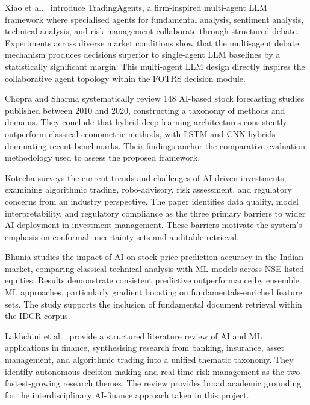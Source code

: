 \documentclass[12pt,a4paper,oneside]{report}
\theoremstyle{definition}
\theoremstyle{remark}
\begin{document}
\medskip

\noindent Xiao et al.\ \cite{Xiao2025TradingAgents} introduce TradingAgents, a firm-inspired multi-agent LLM framework where specialised agents for fundamental analysis, sentiment analysis, technical analysis, and risk management collaborate through structured debate. Experiments across diverse market conditions show that the multi-agent debate mechanism produces decisions superior to single-agent LLM baselines by a statistically significant margin. This multi-agent LLM design directly inspires the collaborative agent topology within the FOTRS decision module.

\medskip

\noindent Chopra and Sharma \cite{Chopra2021AIStockReview} systematically review 148 AI-based stock forecasting studies published between 2010 and 2020, constructing a taxonomy of methods and domains. They conclude that hybrid deep-learning architectures consistently outperform classical econometric methods, with LSTM and CNN hybrids dominating recent benchmarks. Their findings anchor the comparative evaluation methodology used to assess the proposed framework.

\noindent Kotecha \cite{Kotecha2025AIStockTrends} surveys the current trends and challenges of AI-driven investments, examining algorithmic trading, robo-advisory, risk assessment, and regulatory concerns from an industry perspective. The paper identifies data quality, model interpretability, and regulatory compliance as the three primary barriers to wider AI deployment in investment management. These barriers motivate the system's emphasis on conformal uncertainty sets and auditable retrieval.

\medskip

\noindent Bhunia \cite{Bhunia2025AIStockPrediction} studies the impact of AI on stock price prediction accuracy in the Indian market, comparing classical technical analysis with ML models across NSE-listed equities. Results demonstrate consistent predictive outperformance by ensemble ML approaches, particularly gradient boosting on fundamentals-enriched feature sets. The study supports the inclusion of fundamental document retrieval within the IDCR corpus.

\medskip

\noindent Lakhchini et al.\ \cite{Lakhchini2022AIMLFinance} provide a structured literature review of AI and ML applications in finance, synthesising research from banking, insurance, asset management, and algorithmic trading into a unified thematic taxonomy. They identify autonomous decision-making and real-time risk management as the two fastest-growing research themes. The review provides broad academic grounding for the interdisciplinary AI-finance approach taken in this project.
\end{document}
